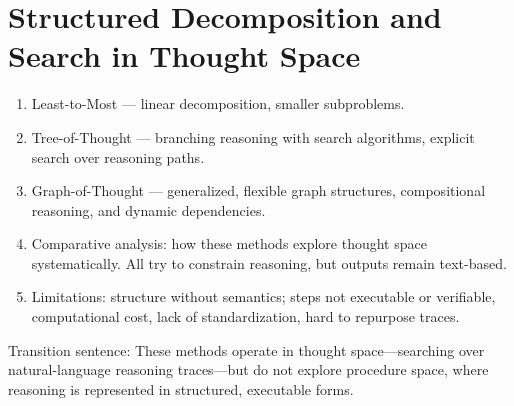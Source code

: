 \documentclass[project]{bsu-cs}  %
\begin{document}
\section{Structured Decomposition and Search in Thought Space}\label{sec:decomp}
\begin{enumerate}
    \item Least-to-Most \citep{zhou2023leasttomostpromptingenablescomplex} — linear decomposition, smaller subproblems.

    \item Tree-of-Thought \citep{yao2023treethoughtsdeliberateproblem} — branching reasoning with search algorithms, explicit search over reasoning paths.

    \item Graph-of-Thought \citep{Besta_2024} — generalized, flexible graph structures, compositional reasoning, and dynamic dependencies.

    \item Comparative analysis: how these methods explore thought space systematically. All try to constrain reasoning, but outputs remain text-based.

    \item Limitations: structure without semantics; steps not executable or verifiable, computational cost, lack of standardization, hard to repurpose traces.

\end{enumerate}

Transition sentence: These methods operate in thought space—searching over natural-language reasoning traces—but do not explore procedure space, where reasoning is represented in structured, executable forms.
% 
%
%
% 
\end{document}
